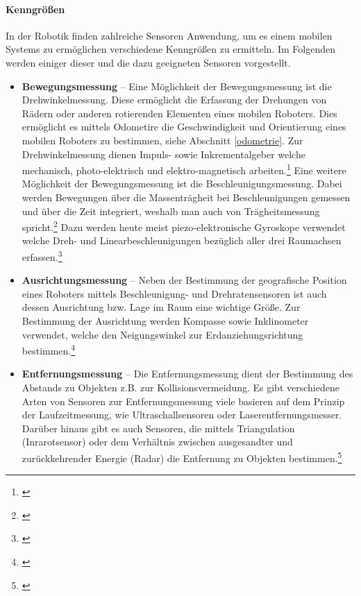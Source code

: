 \paragraph{Kenngrößen}
\color{finishing}
In der Robotik finden zahlreiche Sensoren Anwendung, um es einem mobilen Systems zu ermöglichen verschiedene Kenngrößen zu ermitteln. Im Folgenden werden einiger dieser und die dazu geeigneten Sensoren vorgestellt.
\begin{itemize}
	\item{\textbf{Bewegungsmessung}} -- Eine Möglichkeit der Bewegungsmessung ist die Drehwinkelmessung. Diese ermöglicht die Erfassung der Drehungen von Rädern oder anderen rotierenden Elementen eines mobilen Roboters. Dies ermöglicht es mittels Odometire die Geschwindigkeit und Orientierung eines mobilen Roboters zu bestimmen, siehe Abschnitt \eqref{odometrie}. Zur Drehwinkelmessung dienen Impuls- sowie Inkrementalgeber welche mechanisch, photo-elektrisch und elektro-magnetisch arbeiten.\footnote{\citep[vgl.][Mobile Roboter, Seite 28 ff.]{Hertzberg.MobileRoboter}\label{note10}}
	\newline
	Eine weitere Möglichkeit der Bewegungsmessung ist die Beschleunigungsmessung. Dabei werden Bewegungen über die Massenträgheit bei Beschleunigungen gemessen und über die Zeit integriert, weshalb man auch von Trägheitsmessung spricht.\footnote{\citep[vgl.][Mobile Roboter, Seite 31]{Hertzberg.MobileRoboter}\label{note11}} Dazu werden heute meist
	piezo-elektronische Gyroskope verwendet welche Dreh- und Linearbeschleunigungen bezüglich aller drei Raumachsen erfassen.\footnote{\citep[vgl.][Mobile Roboter, Seite 32 ff.]{Hertzberg.MobileRoboter}\label{note11}}
	\item{\textbf{Ausrichtungsmessung}} -- Neben der Bestimmung der geografische Position eines Roboters mittels Beschleunigung- und Drehratensensoren ist auch dessen Ausrichtung bzw. Lage im Raum eine wichtige Größe. Zur Bestimmung der Ausrichtung werden Kompasse sowie Inklinometer verwendet, welche den Neigungswinkel zur Erdanziehungsrichtung bestimmen.\footnote{\citep[vgl.][Mobile Roboter, Seite 32 f.]{Hertzberg.MobileRoboter}\label{note12}}
	\item{\textbf{Entfernungsmessung}} -- Die Entfernungsmessung dient der Bestimmung des Abstands zu Objekten z.B. zur Kollisionsvermeidung. 
	\newline
	Es gibt verschiedene Arten von Sensoren zur Entfernungsmessung viele basieren auf dem Prinzip der Laufzeitmessung, wie Ultraschallsensoren oder Laserentfernungsmesser. Darüber hinaus gibt es auch Sensoren, die mittels Triangulation (Inrarotsensor) oder dem Verhältnis zwischen ausgesandter und zurückkehrender Energie (Radar) die Entfernung zu Objekten bestimmen.\footnote{\citep[vgl.][Mobile Roboter, Seite 36 f.]{Hertzberg.MobileRoboter}\label{note13}}
\end{itemize}

